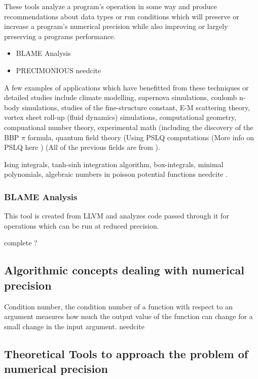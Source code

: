 \documentclass[american]{article}
\newcommand{\complete}{
	\gls{complete}
}
\newcommand{\needcite}{
	\gls{needcite}
}
\begin{document}
These tools analyze a program's operation in some way and produce recommendations about data types or run conditions which will preserve or increase a program's numerical precision while also improving or largely preserving a programs performance.

\begin{itemize}
\item BLAME Analysis \cite{blame-analysis}
\item PRECIMONIOUS \needcite
\end{itemize}

A few examples of applications which have benefitted from these techniques or detailed studies include climate modelling, supernova simulations, coulomb n-body simulations, studies of the fine-structure constant, E-M scattering theory, vortex sheet roll-up (fluid dynamics) simulations, computational geometry, compuational number theory, experimental math (including the discovery of the BBP $\pi$ formula, quantum field theory (Using PSLQ computations (More info on PSLQ here \cite{dhb-numerical-bugs}) (All of the previous fields are from \cite{high-precision-arith-in-science}).

Ising integrals, tanh-sinh integration algorithm, box-integrals, minimal polynomials, algebraic numbers in poisson potential functions \needcite \cite{dhb-zurich-hp}.

\subsubsection{BLAME Analysis} \label{sec:precision-optimizers-blame}

This tool is created from LLVM and analyzes code passed through it for operations which can be run at reduced precision. \cite{blame-analysis}

\complete?

\subsection{Algorithmic concepts dealing with numerical precision} \label{sec:precision-algorithms}

Condition number, the condition number of a function with respect to an argument measures how much the output value of the function can change for a small change in the input argument. \needcite

\subsection{Theoretical Tools to approach the problem of numerical precision} \label{sec:precision-theory}
\end{document}
